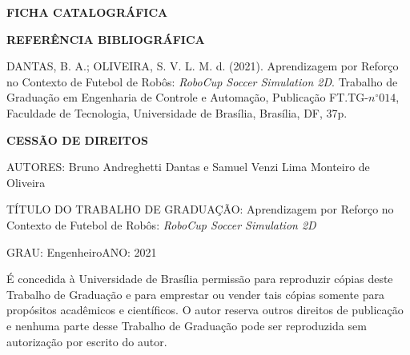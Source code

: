 \noindent \textbf{FICHA CATALOGRÁFICA}

\noindent %

\noindent \medskip{}


\noindent \textbf{REFERÊNCIA BIBLIOGRÁFICA}

DANTAS, B. A.; OLIVEIRA, S. V. L. M. d. (2021). Aprendizagem por Reforço no Contexto de Futebol de Robôs: \textit{RoboCup Soccer Simulation 2D}. Trabalho de Graduação
em Engenharia de Controle e Automação, Publicação FT.TG-$n^{\circ}014$,
Faculdade de Tecnologia, Universidade de Brasília, Brasília, DF, 37p.

\noindent \bigskip{}


\noindent \textbf{CESSÃO DE DIREITOS}

\noindent AUTORES: Bruno Andreghetti Dantas e Samuel Venzi Lima Monteiro de Oliveira

TÍTULO DO TRABALHO DE GRADUAÇÃO: Aprendizagem por Reforço no Contexto de Futebol de Robôs: \textit{RoboCup Soccer Simulation 2D}

\noindent \medskip{}


\noindent GRAU: Engenheiro\hfill{}ANO: 2021\hfill{}

\noindent \medskip{}


É concedida à Universidade de Brasília permissão para reproduzir cópias
deste Trabalho de Graduação e para emprestar ou vender tais cópias
somente para propósitos acadêmicos e científicos. O autor reserva
outros direitos de publicação e nenhuma parte desse Trabalho de Graduação
pode ser reproduzida sem autorização por escrito do autor.

